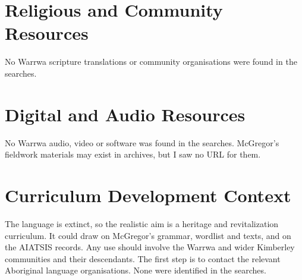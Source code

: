 \documentclass[12pt]{article}
\begin{document}
\section{Religious and Community Resources}
No Warrwa scripture translations or community organisations were found in the searches.

\section{Digital and Audio Resources}
No Warrwa audio, video or software was found in the searches. McGregor's fieldwork materials may exist in archives, but I saw no URL for them.

\section{Curriculum Development Context}
The language is extinct, so the realistic aim is a heritage and revitalization curriculum. It could draw on McGregor's grammar, wordlist and texts, and on the AIATSIS records. Any use should involve the Warrwa and wider Kimberley communities and their descendants. The first step is to contact the relevant Aboriginal language organisations. None were identified in the searches.
\end{document}
